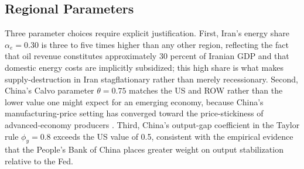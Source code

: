 \documentclass[12pt]{article}
\begin{document}
\subsection{Regional Parameters}

Three parameter choices require explicit justification. First, Iran's energy share $\alpha_e = 0.30$ is three to five times higher than any other region, reflecting the fact that oil revenue constitutes approximately 30 percent of Iranian GDP and that domestic energy costs are implicitly subsidized; this high share is what makes supply-destruction in Iran stagflationary rather than merely recessionary. Second, China's Calvo parameter $\theta = 0.75$ matches the US and ROW rather than the lower value one might expect for an emerging economy, because China's manufacturing-price setting has converged toward the price-stickiness of advanced-economy producers \citep{gali2015monetary}. Third, China's output-gap coefficient in the Taylor rule $\phi_y = 0.8$ exceeds the US value of 0.5, consistent with the empirical evidence that the People's Bank of China places greater weight on output stabilization relative to the Fed.
\end{document}
